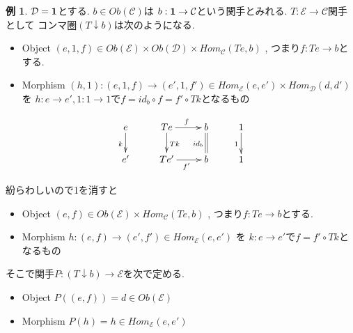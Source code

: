 \documentclass[dvipdfmx,a4paper,11pt]{article}
\theoremstyle{definition}
\newtheorem{exa}[thm]{例}
\begin{document}
\begin{exa}
$\mathcal{D}={\bf 1}$とする.
$b \in Ob(\mathcal{C})$は
$b :  {\bf 1} \to \mathcal{C}$という関手とみれる. 
$T : \mathcal{E} \to \mathcal{C}$関手として
コンマ圏$(T \downarrow b)$は次のようになる.
\begin{itemize}
\item Object $(e,1,f) \in Ob(\mathcal{E}) \times Ob(\mathcal{D}) \times Hom_{\mathcal{C}}(Te,b)$ , つまり$f :  Te \to b$とする. 
\item Morphism $(h,1) : (e,1,f)  \to (e',1,f') \in Hom_{\mathcal{E}}(e,e') \times Hom_{\mathcal{D}}(d,d')$ を $h: e \to e', 1 : 1 \to 1$で$f = id_b \circ f = f' \circ Tk $となるもの
\end{itemize}

\begin{equation*}
\xymatrix@C=25pt@R=20pt{
e \ar@{->}[d]_{k}
&Te  \ar@{->}[r]^{f} \ar@{->}[d]^{Tk} 
& b \ar@{=}[d]_{id_b}
&1\ar@{->}[d] _{1}\\
e'
&Te'\ar@{->}[r]_{f'} 
& b
&1 \\   
}
\end{equation*}

紛らわしいので1を消すと
\begin{itemize}
\item Object $(e,f) \in Ob(\mathcal{E}) \times Hom_{\mathcal{C}}(Te,b)$ , つまり$f : Te\to b$とする. 
\item Morphism $h : (e,f)  \to (e',f') \in Hom_{\mathcal{E}}(e,e') $ を 
$k: e \to e'$で$f = f' \circ Tk$となるもの
\end{itemize}

そこで関手$P : (T\downarrow b) \to \mathcal{E}$を次で定める. 
\begin{itemize}
\item Object $P((e,f)) = d \in Ob(\mathcal{E})$
\item Morphism $P(h) = h \in Hom_{\mathcal{E}}(e,e') $
\end{itemize}


\end{exa}
\end{document}
